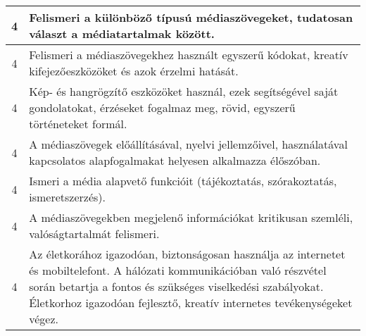 \begin{longtable}{c | p{} }
                                
                                          4 &  Felismeri a különböző típusú médiaszövegeket, tudatosan választ a médiatartalmak között. \\ \hline
                                          4 &  Felismeri a médiaszövegekhez használt egyszerű kódokat, kreatív kifejezőeszközöket és azok érzelmi hatását. \\ \hline
                                          4 &  Kép- és hangrögzítő eszközöket használ, ezek segítségével saját gondolatokat, érzéseket fogalmaz meg, rövid, egyszerű történeteket formál. \\ \hline
                                          4 &  A médiaszövegek előállításával, nyelvi jellemzőivel, használatával kapcsolatos alapfogalmakat  helyesen alkalmazza élőszóban. \\ \hline
                                          4 &  Ismeri a média alapvető funkcióit (tájékoztatás, szórakoztatás, ismeretszerzés). \\ \hline
                                          4 &  A médiaszövegekben megjelenő információkat kritikusan szemléli,  valóságtartalmát felismeri. \\ \hline
                                          4 &  Az életkorához igazodóan,  biztonságosan használja az internetet és mobiltelefont.  A hálózati kommunikációban való részvétel során betartja a fontos és szükséges viselkedési szabályokat. Életkorhoz igazodóan fejlesztő, kreatív internetes tevékenységeket végez. \\ \hline
                                      
                        \end{longtable}
            \clearpage

